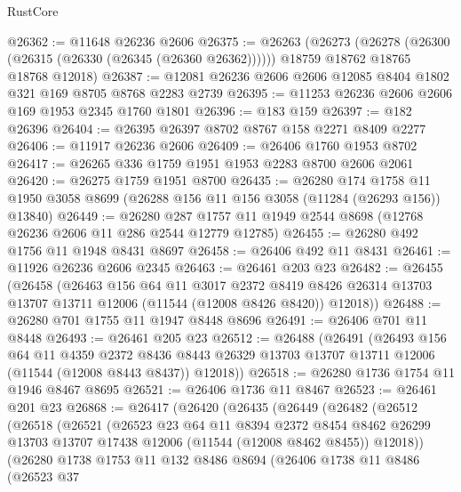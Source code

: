 \begin{lexlean}{RustCore}
\begin{coremodule}
@26362 := @11648 @26236 @2606
@26375 := @26263
    (@26273
      (@26278 (@26300 (@26315 (@26330 (@26345 (@26360 @26362))))))
      @18759
      @18762
      @18765
      @18768
      @12018)
@26387 := @12081 @26236 @2606 @2606 @12085 @8404 @1802 @321 @169 @8705 @8768 @2283 @2739
@26395 := @11253 @26236 @2606 @2606 @169 @1953 @2345 @1760 @1801
@26396 := @183 @159
@26397 := @182 @26396
@26404 := @26395 @26397 @8702 @8767 @158 @2271 @8409 @2277
@26406 := @11917 @26236 @2606
@26409 := @26406 @1760 @1953 @8702
@26417 := @26265 @336 @1759 @1951 @1953 @2283 @8700 @2606 @2061
@26420 := @26275 @1759 @1951 @8700
@26435 := @26280
    @174
    @1758
    @11
    @1950
    @3058
    @8699
    (@26288 @156 @11 @156 @3058 (@11284 (@26293 @156)) @13840)
@26449 := @26280 @287 @1757 @11 @1949 @2544 @8698 (@12768 @26236 @2606 @11 @286 @2544 @12779 @12785)
@26455 := @26280 @492 @1756 @11 @1948 @8431 @8697
@26458 := @26406 @492 @11 @8431
@26461 := @11926 @26236 @2606 @2345
@26463 := @26461 @203 @23
@26482 := @26455
    (@26458
      (@26463
        @156
        @64
        @11
        @3017
        @2372
        @8419
        @8426
        @26314
        @13703
        @13707
        @13711
        @12006
        (@11544 (@12008 @8426 @8420))
        @12018))
@26488 := @26280 @701 @1755 @11 @1947 @8448 @8696
@26491 := @26406 @701 @11 @8448
@26493 := @26461 @205 @23
@26512 := @26488
    (@26491
      (@26493
        @156
        @64
        @11
        @4359
        @2372
        @8436
        @8443
        @26329
        @13703
        @13707
        @13711
        @12006
        (@11544 (@12008 @8443 @8437))
        @12018))
@26518 := @26280 @1736 @1754 @11 @1946 @8467 @8695
@26521 := @26406 @1736 @11 @8467
@26523 := @26461 @201 @23
@26868 := @26417
    (@26420
      (@26435
        (@26449
          (@26482
            (@26512
              (@26518
                (@26521
                  (@26523
                    @23
                    @64
                    @11
                    @8394
                    @2372
                    @8454
                    @8462
                    @26299
                    @13703
                    @13707
                    @17438
                    @12006
                    (@11544 (@12008 @8462 @8455))
                    @12018))
                (@26280
                  @1738
                  @1753
                  @11
                  @132
                  @8486
                  @8694
                  (@26406
                    @1738
                    @11
                    @8486
                    (@26523
                      @37

\end{coremodule}
\end{lexlean}
